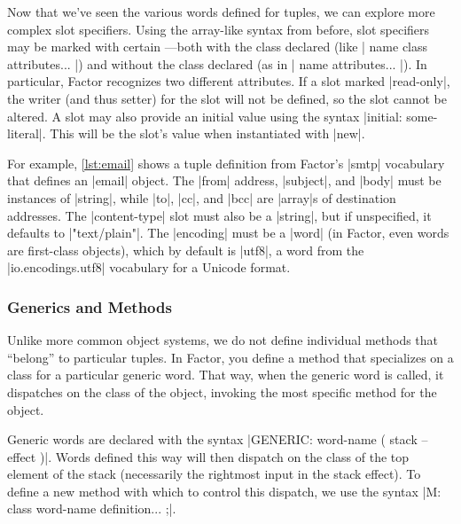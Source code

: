 
Now that we've seen the various words defined for tuples, we can explore more
complex slot specifiers.  Using the array-like syntax from before, slot
specifiers may be marked with certain ---both with the class
declared (like
%
\factor|{ name class attributes... }|)
%
and without the class declared (as in 
%
\factor|{ name attributes... }|).
%
In particular, Factor recognizes two different attributes.  If a slot marked
\factor|read-only|, the writer (and thus setter) for the slot will not be
defined, so the slot cannot be altered.  A slot may also provide an initial
value using the syntax \factor|initial: some-literal|.  This will be the slot's
value when instantiated with \factor|new|. 

For example, \vref{lst:email} shows a tuple definition from Factor's
\factor|smtp| vocabulary that defines an \factor|email| object.  The
\factor|from| address, \factor|subject|, and \factor|body| must be instances of
\factor|string|, while \factor|to|, \factor|cc|, and \factor|bcc| are
\factor|array|s of destination addresses.  The \factor|content-type| slot must
also be a \factor|string|, but if unspecified, it defaults to
\factor|"text/plain"|.  The \factor|encoding| must be a \factor|word| (in
Factor, even words are first-class objects), which by default is \factor|utf8|,
a word from the \factor|io.encodings.utf8| vocabulary for a Unicode format.

\subsubsection{Generics and Methods}

Unlike more common object systems, we do not define individual methods that
``belong'' to particular tuples.  In Factor, you define a method that
specializes on a class for a particular generic word.  That way, when the
generic word is called, it dispatches on the class of the object, invoking the
most specific method for the object.

Generic words are declared with the syntax
%
\factor|GENERIC: word-name ( stack -- effect )|.
%
Words defined this way will then dispatch on the class of the top element of
the stack (necessarily the rightmost input in the stack effect).  To define a
new method with which to control this dispatch, we use the syntax
%
\factor|M: class word-name definition... ;|.


